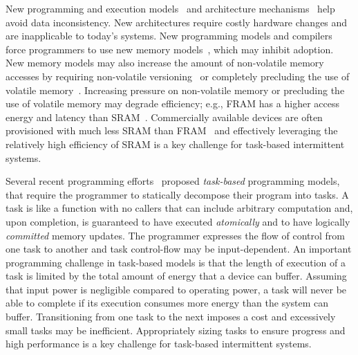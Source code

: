 
New programming and execution models~\cite{dino,ratchet,chain,alpaca} and
architecture mechanisms~\cite{hicks_isca_2017,idetic,nvp} help avoid data
inconsistency. New architectures require costly hardware changes and are
inapplicable to today's systems. New programming models and compilers force
programmers to use new memory models~\cite{chain,ratchet}, which may inhibit
adoption. New memory models may also increase the amount of non-volatile
memory accesses by requiring non-volatile versioning~\cite{chain} or completely
precluding the use of volatile memory~\cite{ratchet}. Increasing pressure on
non-volatile memory or precluding the use of volatile memory may degrade
efficiency; e.g., FRAM has a higher access energy and latency than
SRAM~\cite{alpaca,wisp}. Commercially available devices are often provisioned
with much less SRAM than FRAM~\cite{wolverine,wisp} and effectively leveraging
the relatively high efficiency of SRAM is a key challenge for task-based
intermittent systems.


Several recent programming efforts~\cite{alpaca,chain} proposed {\em
task-based} programming models, that require the programmer to statically
decompose their program into tasks. A task is like a function with no callers
that can include arbitrary computation and, upon completion, is guaranteed to
have executed {\em atomically} and to have logically {\em committed} memory
updates. The programmer expresses the flow of control from one task to another
and task control-flow may be input-dependent. An important programming
challenge in task-based models is that the length of execution of a task is
limited by the total amount of energy that a device can buffer. Assuming that
input power is negligible compared to operating power, a task will never be
able to complete if its execution consumes more energy than the system can
buffer. Transitioning from one task to the next imposes a cost and excessively
small tasks may be inefficient. Appropriately sizing tasks to ensure progress
and high performance is a key challenge for task-based intermittent systems. 

